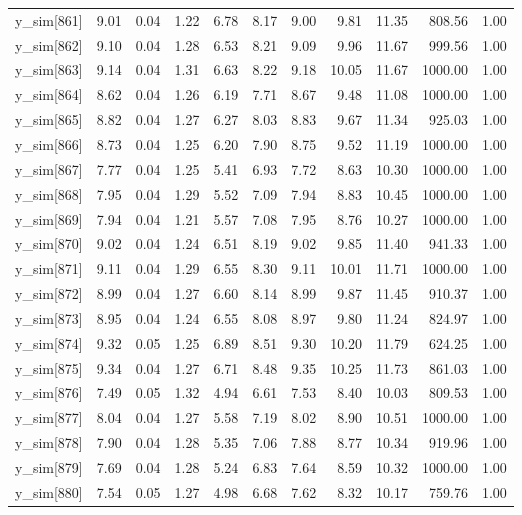 \begin{table}[ht]
\begin{tabular}{rrrrrrrrrrr}
  y\_sim[861] & 9.01 & 0.04 & 1.22 & 6.78 & 8.17 & 9.00 & 9.81 & 11.35 & 808.56 & 1.00 \\ 
  y\_sim[862] & 9.10 & 0.04 & 1.28 & 6.53 & 8.21 & 9.09 & 9.96 & 11.67 & 999.56 & 1.00 \\ 
  y\_sim[863] & 9.14 & 0.04 & 1.31 & 6.63 & 8.22 & 9.18 & 10.05 & 11.67 & 1000.00 & 1.00 \\ 
  y\_sim[864] & 8.62 & 0.04 & 1.26 & 6.19 & 7.71 & 8.67 & 9.48 & 11.08 & 1000.00 & 1.00 \\ 
  y\_sim[865] & 8.82 & 0.04 & 1.27 & 6.27 & 8.03 & 8.83 & 9.67 & 11.34 & 925.03 & 1.00 \\ 
  y\_sim[866] & 8.73 & 0.04 & 1.25 & 6.20 & 7.90 & 8.75 & 9.52 & 11.19 & 1000.00 & 1.00 \\ 
  y\_sim[867] & 7.77 & 0.04 & 1.25 & 5.41 & 6.93 & 7.72 & 8.63 & 10.30 & 1000.00 & 1.00 \\ 
  y\_sim[868] & 7.95 & 0.04 & 1.29 & 5.52 & 7.09 & 7.94 & 8.83 & 10.45 & 1000.00 & 1.00 \\ 
  y\_sim[869] & 7.94 & 0.04 & 1.21 & 5.57 & 7.08 & 7.95 & 8.76 & 10.27 & 1000.00 & 1.00 \\ 
  y\_sim[870] & 9.02 & 0.04 & 1.24 & 6.51 & 8.19 & 9.02 & 9.85 & 11.40 & 941.33 & 1.00 \\ 
  y\_sim[871] & 9.11 & 0.04 & 1.29 & 6.55 & 8.30 & 9.11 & 10.01 & 11.71 & 1000.00 & 1.00 \\ 
  y\_sim[872] & 8.99 & 0.04 & 1.27 & 6.60 & 8.14 & 8.99 & 9.87 & 11.45 & 910.37 & 1.00 \\ 
  y\_sim[873] & 8.95 & 0.04 & 1.24 & 6.55 & 8.08 & 8.97 & 9.80 & 11.24 & 824.97 & 1.00 \\ 
  y\_sim[874] & 9.32 & 0.05 & 1.25 & 6.89 & 8.51 & 9.30 & 10.20 & 11.79 & 624.25 & 1.00 \\ 
  y\_sim[875] & 9.34 & 0.04 & 1.27 & 6.71 & 8.48 & 9.35 & 10.25 & 11.73 & 861.03 & 1.00 \\ 
  y\_sim[876] & 7.49 & 0.05 & 1.32 & 4.94 & 6.61 & 7.53 & 8.40 & 10.03 & 809.53 & 1.00 \\ 
  y\_sim[877] & 8.04 & 0.04 & 1.27 & 5.58 & 7.19 & 8.02 & 8.90 & 10.51 & 1000.00 & 1.00 \\ 
  y\_sim[878] & 7.90 & 0.04 & 1.28 & 5.35 & 7.06 & 7.88 & 8.77 & 10.34 & 919.96 & 1.00 \\ 
  y\_sim[879] & 7.69 & 0.04 & 1.28 & 5.24 & 6.83 & 7.64 & 8.59 & 10.32 & 1000.00 & 1.00 \\ 
  y\_sim[880] & 7.54 & 0.05 & 1.27 & 4.98 & 6.68 & 7.62 & 8.32 & 10.17 & 759.76 & 1.00 \\ 

\end{tabular}
\end{table}
